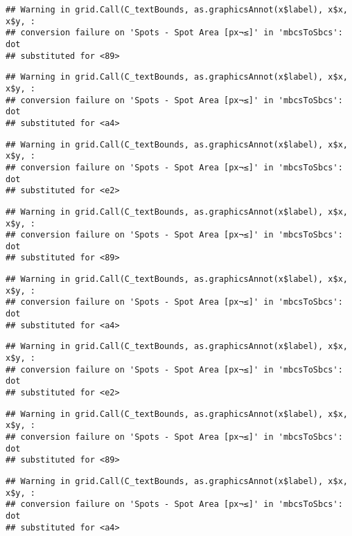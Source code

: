 \documentclass[
]{article}
\begin{document}
\begin{verbatim}
## Warning in grid.Call(C_textBounds, as.graphicsAnnot(x$label), x$x, x$y, :
## conversion failure on 'Spots - Spot Area [px¬≤]' in 'mbcsToSbcs': dot
## substituted for <89>
\end{verbatim}

\begin{verbatim}
## Warning in grid.Call(C_textBounds, as.graphicsAnnot(x$label), x$x, x$y, :
## conversion failure on 'Spots - Spot Area [px¬≤]' in 'mbcsToSbcs': dot
## substituted for <a4>
\end{verbatim}

\begin{verbatim}
## Warning in grid.Call(C_textBounds, as.graphicsAnnot(x$label), x$x, x$y, :
## conversion failure on 'Spots - Spot Area [px¬≤]' in 'mbcsToSbcs': dot
## substituted for <e2>
\end{verbatim}

\begin{verbatim}
## Warning in grid.Call(C_textBounds, as.graphicsAnnot(x$label), x$x, x$y, :
## conversion failure on 'Spots - Spot Area [px¬≤]' in 'mbcsToSbcs': dot
## substituted for <89>
\end{verbatim}

\begin{verbatim}
## Warning in grid.Call(C_textBounds, as.graphicsAnnot(x$label), x$x, x$y, :
## conversion failure on 'Spots - Spot Area [px¬≤]' in 'mbcsToSbcs': dot
## substituted for <a4>
\end{verbatim}

\begin{verbatim}
## Warning in grid.Call(C_textBounds, as.graphicsAnnot(x$label), x$x, x$y, :
## conversion failure on 'Spots - Spot Area [px¬≤]' in 'mbcsToSbcs': dot
## substituted for <e2>
\end{verbatim}

\begin{verbatim}
## Warning in grid.Call(C_textBounds, as.graphicsAnnot(x$label), x$x, x$y, :
## conversion failure on 'Spots - Spot Area [px¬≤]' in 'mbcsToSbcs': dot
## substituted for <89>
\end{verbatim}

\begin{verbatim}
## Warning in grid.Call(C_textBounds, as.graphicsAnnot(x$label), x$x, x$y, :
## conversion failure on 'Spots - Spot Area [px¬≤]' in 'mbcsToSbcs': dot
## substituted for <a4>
\end{verbatim}
\end{document}
